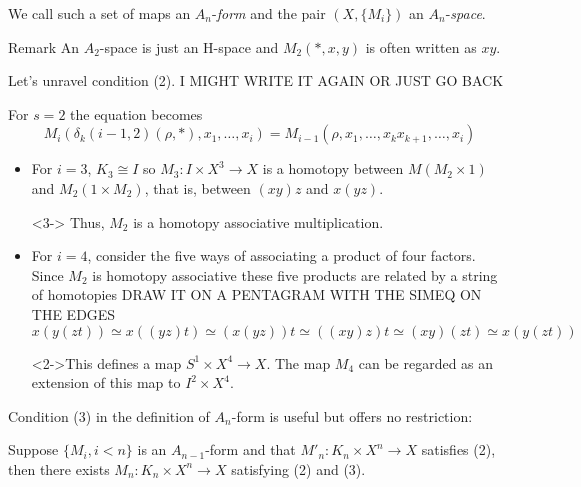 \documentclass{beamer}
\theoremstyle{definition}
\begin{document}
\begin{frame}
We call such a set of maps an $A_n$-\emph{form} and the pair $(X,\{M_i\})$ an $A_n$-\emph{space}.\pause
\begin{block}{Remark}
An $A_2$-space is just an H-space and $M_2(*,x,y)$ is often written as $xy$.
\end{block}\pause
Let's unravel condition (2). I MIGHT WRITE IT AGAIN OR JUST GO BACK
\end{frame}
\begin{frame}
For $s=2$ the equation becomes
\[
M_i(\delta_k(i-1,2)(\rho,*),x_1,\dots, x_i)=M_{i-1}(\rho,x_1,\dots,x_kx_{k+1},\dots, x_i)
\]
\begin{itemize}
\item<2-> For $i=3$, $K_3\cong I$ so $M_3:I\times X^3\to X$ is a homotopy between $M(M_2\times 1)$ and $M_2(1\times M_2)$, that is, between $(xy)z$ and $x(yz)$.
\item[]<3-> Thus, $M_2$ is a homotopy associative multiplication.
\end{itemize}

\end{frame}

\begin{frame}
\begin{itemize}
\item For $i=4$, consider the five ways of associating a product of four factors. Since $M_2$ is homotopy associative these five products are related by a string of homotopies DRAW IT ON A PENTAGRAM WITH THE SIMEQ ON THE EDGES
\[
x(y(zt))\simeq x((yz)t)\simeq (x(yz))t\simeq ((xy)z)t\simeq (xy)(zt)\simeq x(y(zt))
\]
\item[]<2->This defines a map $S^1\times X^4\to X$. The map $M_4$ can be regarded as an extension of this map to $I^2\times X^4$.
\end{itemize}

\end{frame}




\begin{frame}
	Condition (3) in the definition of $A_n$-form is useful but offers no restriction:
	\begin{lemma}
	Suppose $\{M_i, i<n\}$ is an $A_{n-1}$-form and that $M'_n:K_n\times X^n\to X$ satisfies (2), then there exists $M_n:K_n\times X^n\to X$ satisfying (2) and (3).  
	\end{lemma}	
\end{frame}
\end{document}
